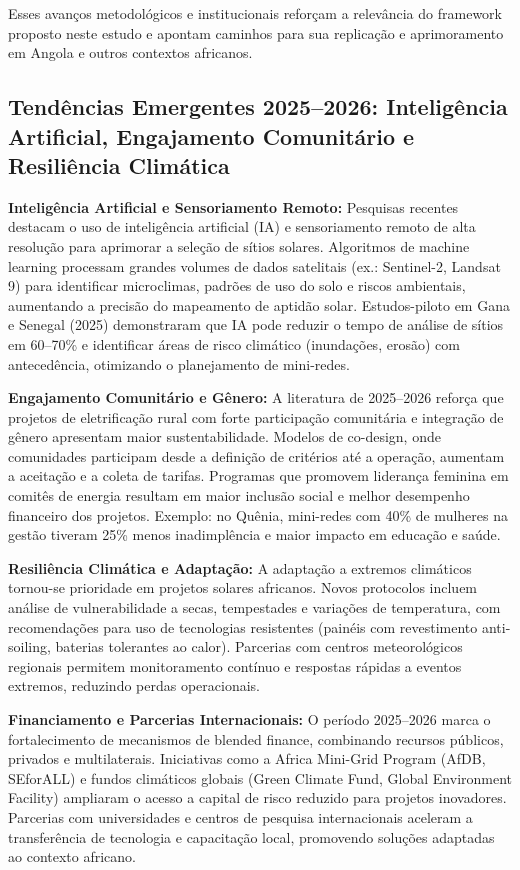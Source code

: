 \documentclass[12pt, a4paper]{article}
\begin{document}
Esses avanços metodológicos e institucionais reforçam a relevância do framework proposto neste estudo e apontam caminhos para sua replicação e aprimoramento em Angola e outros contextos africanos.

\subsection{Tendências Emergentes 2025–2026: Inteligência Artificial, Engajamento Comunitário e Resiliência Climática}
\textbf{Inteligência Artificial e Sensoriamento Remoto:} Pesquisas recentes destacam o uso de inteligência artificial (IA) e sensoriamento remoto de alta resolução para aprimorar a seleção de sítios solares. Algoritmos de machine learning processam grandes volumes de dados satelitais (ex.: Sentinel-2, Landsat 9) para identificar microclimas, padrões de uso do solo e riscos ambientais, aumentando a precisão do mapeamento de aptidão solar. Estudos-piloto em Gana e Senegal (2025) demonstraram que IA pode reduzir o tempo de análise de sítios em 60–70\% e identificar áreas de risco climático (inundações, erosão) com antecedência, otimizando o planejamento de mini-redes.

\textbf{Engajamento Comunitário e Gênero:} A literatura de 2025–2026 reforça que projetos de eletrificação rural com forte participação comunitária e integração de gênero apresentam maior sustentabilidade. Modelos de co-design, onde comunidades participam desde a definição de critérios até a operação, aumentam a aceitação e a coleta de tarifas. Programas que promovem liderança feminina em comitês de energia resultam em maior inclusão social e melhor desempenho financeiro dos projetos. Exemplo: no Quênia, mini-redes com 40\% de mulheres na gestão tiveram 25\% menos inadimplência e maior impacto em educação e saúde.

\textbf{Resiliência Climática e Adaptação:} A adaptação a extremos climáticos tornou-se prioridade em projetos solares africanos. Novos protocolos incluem análise de vulnerabilidade a secas, tempestades e variações de temperatura, com recomendações para uso de tecnologias resistentes (painéis com revestimento anti-soiling, baterias tolerantes ao calor). Parcerias com centros meteorológicos regionais permitem monitoramento contínuo e respostas rápidas a eventos extremos, reduzindo perdas operacionais.

\textbf{Financiamento e Parcerias Internacionais:} O período 2025–2026 marca o fortalecimento de mecanismos de blended finance, combinando recursos públicos, privados e multilaterais. Iniciativas como a Africa Mini-Grid Program (AfDB, SEforALL) e fundos climáticos globais (Green Climate Fund, Global Environment Facility) ampliaram o acesso a capital de risco reduzido para projetos inovadores. Parcerias com universidades e centros de pesquisa internacionais aceleram a transferência de tecnologia e capacitação local, promovendo soluções adaptadas ao contexto africano.
\end{document}
